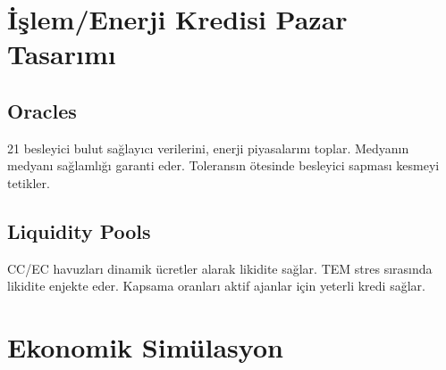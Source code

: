 \documentclass[11pt]{article}
\begin{document}
\begin{itemize}[noitemsep]
\begin{itemize}[noitemsep]
\begin{itemize}[noitemsep]
\begin{itemize}[noitemsep]
\begin{itemize}[noitemsep]
\begin{itemize}[noitemsep]
\begin{itemize}[noitemsep]
\begin{enumerate}[noitemsep]
\section{İşlem/Enerji Kredisi Pazar Tasarımı}
\subsection{Oracles}
21 besleyici bulut sağlayıcı verilerini, enerji piyasalarını toplar. Medyanın medyanı sağlamlığı garanti eder. Toleransın ötesinde besleyici sapması kesmeyi tetikler.

\subsection{Liquidity Pools}
CC/EC havuzları dinamik ücretler alarak likidite sağlar. TEM stres sırasında likidite enjekte eder. Kapsama oranları aktif ajanlar için yeterli kredi sağlar.

\section{Ekonomik Simülasyon}
\label{sec:econ-sim}


\end{enumerate}
\end{itemize}
\end{itemize}
\end{itemize}
\end{itemize}
\end{itemize}
\end{itemize}
\end{itemize}
\end{document}
